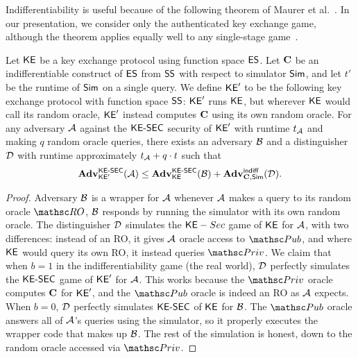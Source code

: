 Indifferentiability is useful because of the following theorem of Maurer et al.~\cite{TCC:MauRenHol04}. In our presentation, we consider only the authenticated key exchange game, although the theorem applies equally well to any single-stage game~\cite{EC:RisShaShr11}. 

\begin{theorem} 
	\label{thm:indiff-comp}
	Let $\mathsf{KE}$ be a key exchange protocol using function space $\mathsf{ES}$. Let $\mathbf{C}$ be an indifferentiable construct of $\mathsf{ES}$ from $\mathsf{SS}$ with respect to simulator $\mathsf{Sim}$, and let $t'$ be the runtime of $\mathsf{Sim}$ on a single query. We define $\mathsf{KE}'$ to be the following key exchange protocol with function space $\mathsf{SS}$: $\mathsf{KE}'$ runs $\mathsf{KE}$, but wherever $\mathsf{KE}$ would call its random oracle, $\mathsf{KE}'$ instead computes $\mathbf{C}$ using its own random oracle. For any adversary $\mathcal{A}$ against the $\mathsf{KE{\text{\normalfont-}}SEC}$ security of $\mathsf{KE}'$ with runtime $t_{\mathcal{A}}$ and making $q$ random oracle queries, there exists an adversary $\mathcal{B}$ and a distinguisher $\mathcal{D}$ with runtime approximately $t_{\mathcal{A}} + q \cdot t$ such that
	\[ \mathbf{Adv}^{\mathrm{\mathsf{KE{\text{\normalfont-}}SEC}}}_{\mathsf{KE}'}(\mathcal{A}) \leq \mathbf{Adv}^{\mathrm{\mathsf{KE{\text{\normalfont-}}SEC}}}_{\mathsf{KE}}(\mathcal{B}) + \mathbf{Adv}^{\mathrm{\mathsf{indiff}}}_{\mathbf{C},\mathsf{Sim}}(\mathcal{D}). \]
\end{theorem}

\begin{proof}
	Adversary $\mathcal{B}$ is a wrapper for $\mathcal{A}$ whenever $\mathcal{A}$ makes a query to its random oracle $\RO$, $\mathcal{B}$ responds by running the simulator with its own random oracle. The distinguisher $\mathcal{D}$ simulates the $\mathsf{KE}-Sec$ game of $\mathsf{KE}$ for $\mathcal{A}$, with two differences: instead of an RO, it gives $\mathcal{A}$ oracle access to $\PubO$, and where $\mathsf{KE}$ would query its own RO, it instead queries $\PrivO$. 
	We claim that when $b=1$ in the indifferentiability game (the real world), $\mathcal{D}$ perfectly simulates the $\mathsf{KE{\text{\normalfont-}}SEC}$ game of $\mathsf{KE}'$ for $\mathcal{A}$. This works because the $\PrivO$ oracle computes $\mathbf{C}$ for $\mathsf{KE}'$, and the $\PubO$ oracle is indeed an RO as $\mathcal{A}$ expects. When $b=0$, $\mathcal{D}$ perfectly simulates $\mathsf{KE{\text{\normalfont-}}SEC}$ of $\mathsf{KE}$ for $\mathcal{B}$. The $\PubO$ oracle answers all of $\mathcal{A}$'s queries using the simulator, so it properly executes the wrapper code that makes up $\mathcal{B}$. The rest of the simulation is honest, down to the random oracle accessed via $\PrivO$. 
\end{proof}